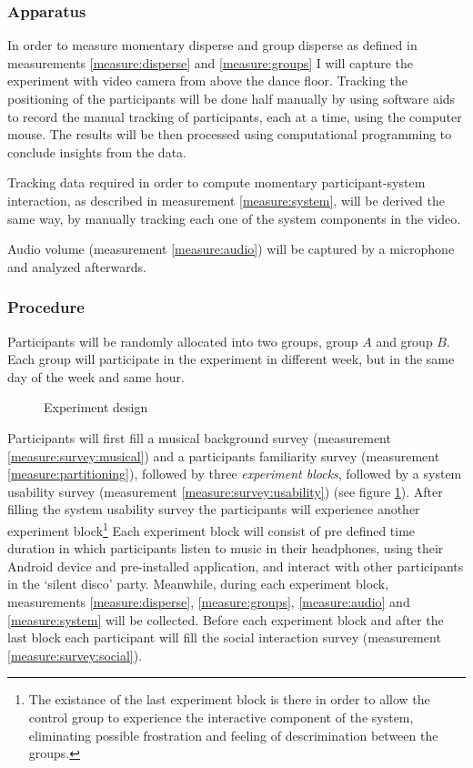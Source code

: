 \documentclass[a4paper,11pt]{article}
\newcommand{\definition}[1]{\emph{#1}}
\begin{document}
{\subsubsection{Apparatus}\label{aparatus}

In order to measure momentary disperse and group disperse as defined in measurements \ref{measure:disperse} and \ref{measure:groups} I will capture the experiment with video camera from above the dance floor.
Tracking the positioning of the participants will be done half manually by using software aids to record the manual tracking of participants, each at a time, using the computer mouse.
The results will be then processed using computational programming to conclude insights from the data.

Tracking data required in order to compute momentary participant-system interaction, as described in measurement \ref{measure:system}, will be derived the same way, by manually tracking each one of the system components in the video.

Audio volume (measurement \ref{measure:audio}) will be captured by a microphone and analyzed afterwards.

\subsubsection{Procedure}

Participants will be randomly allocated into two groups, group $A$ and group $B$\@.
Each group will participate in the experiment in different week, but in the same day of the week and same hour.

\begin{figure}[!htb]
	\centering
	\def\svgwidth{0.9\textwidth}
  	
	\caption{Experiment design}\label{fig:experiment}
\end{figure}

Participants will first fill a musical background survey (measurement \ref{measure:survey:musical}) and a participants familiarity survey (measurement \ref{measure:partitioning}), followed by three \definition{experiment blocks}, followed by a system usability survey (measurement \ref{measure:survey:usability}) (see figure \ref{fig:experiment}).
After filling the system usability survey the participants will experience another experiment block\footnote{The existance of the last experiment block is there in order to allow the control group to experience the interactive component of the system, eliminating possible frostration and feeling of descrimination between the groups.}
Each experiment block will consist of pre defined time duration in which participants listen to music in their headphones, using their Android device and pre-installed application, and interact with other participants in the `silent disco' party.
Meanwhile, during each experiment block, measurements \ref{measure:disperse}, \ref{measure:groups}, \ref{measure:audio} and \ref{measure:system} will be collected.
Before each experiment block and after the last block each participant will fill the social interaction survey (measurement \ref{measure:survey:social}).

}
\end{document}
